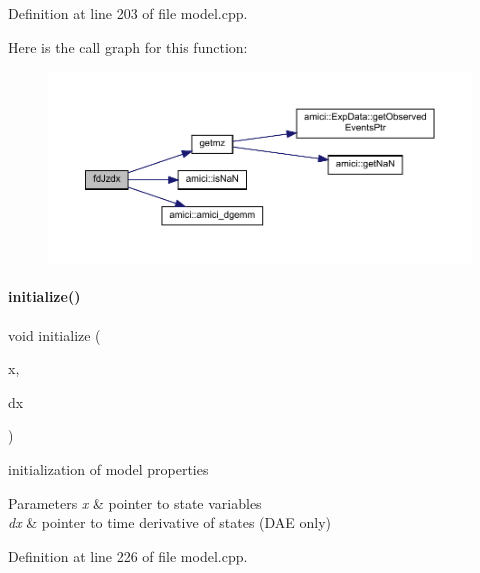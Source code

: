 Definition at line 203 of file model.\+cpp.

Here is the call graph for this function\+:
\nopagebreak
\begin{figure}[H]
\begin{center}
\leavevmode
\includegraphics[width=350pt]{classamici_1_1_model_a588e7cb4790ce3b77700a3acef1c43fc_cgraph}
\end{center}
\end{figure}
\mbox{\label{classamici_1_1_model_a4d8f308f15a126dde571f2e26787d3e8}} 
\paragraph{\texorpdfstring{initialize()}{initialize()}}
{\footnotesize\ttfamily void initialize (\begin{DoxyParamCaption}\item[{\mbox{\hyperlink{classamici_1_1_ami_vector}{Ami\+Vector}} $\ast$}]{x,  }\item[{\mbox{\hyperlink{classamici_1_1_ami_vector}{Ami\+Vector}} $\ast$}]{dx }\end{DoxyParamCaption})}

initialization of model properties 
\begin{DoxyParams}{Parameters}
{\em x} & pointer to state variables \\
\hline
{\em dx} & pointer to time derivative of states (D\+AE only) \\
\hline
\end{DoxyParams}


Definition at line 226 of file model.\+cpp.

